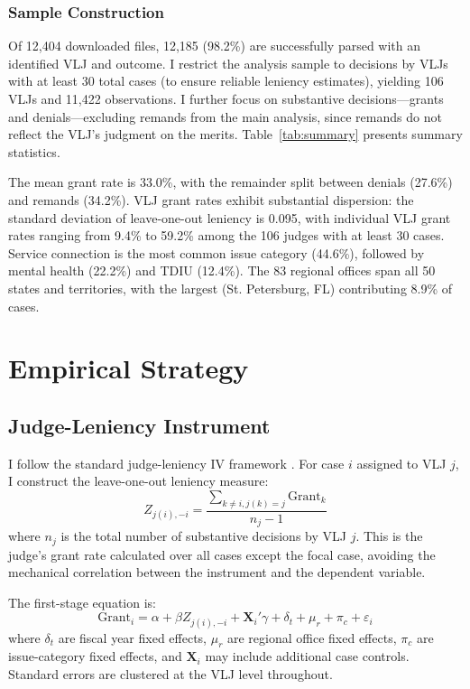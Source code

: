 \documentclass[12pt]{article}
\begin{document}
\subsubsection*{Sample Construction} Of 12,404 downloaded files, 12,185 (98.2\%) are successfully parsed with an identified VLJ and outcome. I restrict the analysis sample to decisions by VLJs with at least 30 total cases (to ensure reliable leniency estimates), yielding 106 VLJs and 11,422 observations. I further focus on substantive decisions---grants and denials---excluding remands from the main analysis, since remands do not reflect the VLJ's judgment on the merits. Table~\ref{tab:summary} presents summary statistics.



The mean grant rate is 33.0\%, with the remainder split between denials (27.6\%) and remands (34.2\%). VLJ grant rates exhibit substantial dispersion: the standard deviation of leave-one-out leniency is 0.095, with individual VLJ grant rates ranging from 9.4\% to 59.2\% among the 106 judges with at least 30 cases. Service connection is the most common issue category (44.6\%), followed by mental health (22.2\%) and TDIU (12.4\%). The 83 regional offices span all 50 states and territories, with the largest (St. Petersburg, FL) contributing 8.9\% of cases.


\section{Empirical Strategy}

\subsection{Judge-Leniency Instrument}

I follow the standard judge-leniency IV framework \citep{kling2006,maestas2013,chyn2024}. For case $i$ assigned to VLJ $j$, I construct the leave-one-out leniency measure:
\begin{equation}
Z_{j(i),-i} = \frac{\sum_{k \neq i, j(k)=j} \text{Grant}_k}{n_j - 1}
\end{equation}
where $n_j$ is the total number of substantive decisions by VLJ $j$. This is the judge's grant rate calculated over all cases except the focal case, avoiding the mechanical correlation between the instrument and the dependent variable.

The first-stage equation is:
\begin{equation}
\text{Grant}_i = \alpha + \beta Z_{j(i),-i} + \mathbf{X}_i'\gamma + \delta_t + \mu_r + \pi_c + \varepsilon_i
\end{equation}
where $\delta_t$ are fiscal year fixed effects, $\mu_r$ are regional office fixed effects, $\pi_c$ are issue-category fixed effects, and $\mathbf{X}_i$ may include additional case controls. Standard errors are clustered at the VLJ level throughout.
\end{document}
